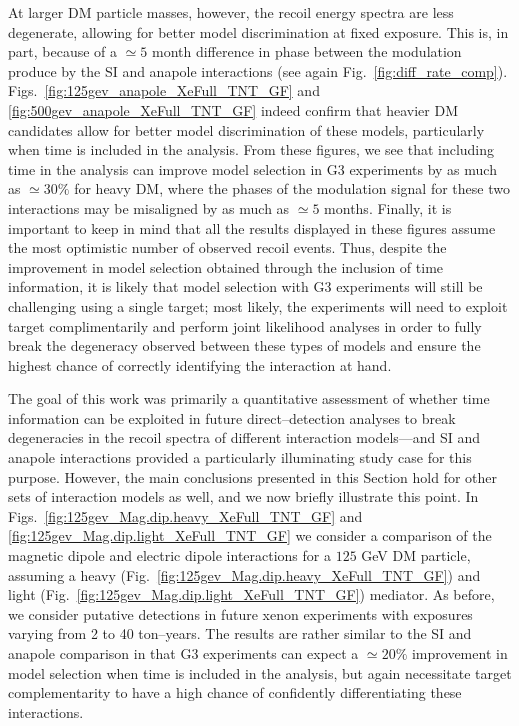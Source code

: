 \documentclass[11pt]{article}
\newcommand{\Fig}[1]{Fig.~\ref{#1}} \newcommand{\Figs}[2]{Figs.~\ref{#1} and \ref{#2}}
\begin{document}
At larger DM particle masses, however, the recoil energy spectra are less degenerate, allowing for better model discrimination at fixed exposure. This is, in part, because of a $\simeq 5$ month difference in phase between the modulation produce by the SI and anapole interactions (see again \Fig{fig:diff_rate_comp}). Figs.~\ref{fig:125gev_anapole_XeFull_TNT_GF} and \ref{fig:500gev_anapole_XeFull_TNT_GF} indeed confirm that heavier DM candidates allow for better model discrimination of these models, particularly when time is included in the analysis. From these figures, we see that including time in the analysis can improve model selection in G3 experiments by as much as $\simeq 30\%$ for heavy DM, where the phases of the modulation signal for these two interactions may be misaligned by as much as $\simeq 5$ months. Finally, it is important to keep in mind that all the results displayed in these figures assume the most optimistic number of observed recoil events. Thus, despite the improvement in model selection obtained through the inclusion of time information, it is likely that model selection with G3 experiments will still be challenging using a single target; most likely, the experiments will need to exploit target complimentarily and perform joint likelihood analyses in order to fully break the degeneracy observed between these types of models and ensure the highest chance of correctly identifying the interaction at hand. 

The goal of this work was primarily a quantitative assessment of whether time information can be exploited in future direct--detection analyses to break degeneracies in the recoil spectra of different interaction models---and SI and anapole interactions provided a particularly illuminating study case for this purpose. However, the main conclusions presented in this Section hold for other sets of interaction models as well, and we now briefly illustrate this point. In \Figs{fig:125gev_Mag.dip.heavy_XeFull_TNT_GF}{fig:125gev_Mag.dip.light_XeFull_TNT_GF} we consider a comparison of the magnetic dipole and electric dipole interactions for a $125$ GeV DM particle, assuming a heavy (\Fig{fig:125gev_Mag.dip.heavy_XeFull_TNT_GF}) and light (\Fig{fig:125gev_Mag.dip.light_XeFull_TNT_GF}) mediator. As before, we consider putative detections in future xenon experiments with exposures varying from 2 to 40 ton--years. The results are rather similar to the SI and anapole comparison in that G3 experiments can expect a $\simeq 20\%$ improvement in model selection when time is included in the analysis, but again necessitate target complementarity to have a high chance of confidently differentiating these interactions.
\end{document}
